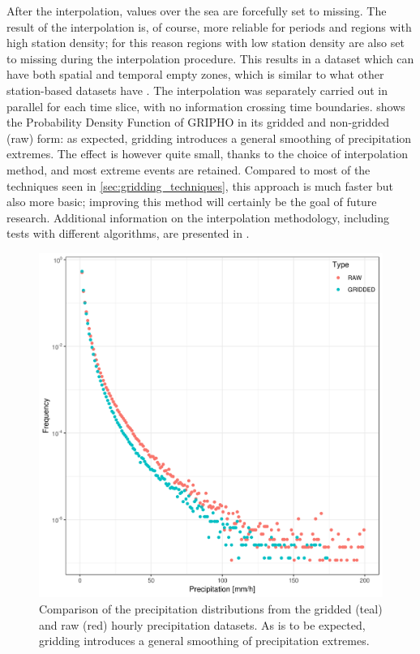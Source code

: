 After the interpolation, values over the sea are forcefully set to missing.
The result of the interpolation is, of course, more reliable for periods and regions with high station density; for this reason regions with low station density are also set to missing during the interpolation procedure.
This results in a dataset which can have both spatial and temporal empty zones, which is similar to what other station-based datasets have \citep[the E-OBS dataset from][for example, also has varying missing values]{Hofstra2008}.
The interpolation was separately carried out in parallel for each time slice, with no information crossing time boundaries.
 shows the Probability Density Function of GRIPHO in its gridded and non-gridded (raw) form: as expected, gridding introduces a general smoothing of precipitation extremes. The effect is however quite small, thanks to the choice of interpolation method, and most extreme events are retained.
Compared to most of the techniques seen in \cref{sec:gridding_techniques}, this approach is much faster but also more basic; improving this method will certainly be the goal of future research.
Additional information on the interpolation methodology, including tests with different algorithms, are presented in \citep[][in preparation]{Fantini2018a}.

\begin{figure}
    \centering
    \includegraphics[width=\textwidth]{figures/rain_dst/validation/compare.png}
    \decoRule
    \caption[PDFs for gridded and raw station data for the Italian hourly precipitation dataset GRIPHO]{Comparison of the precipitation distributions from the gridded (teal) and raw (red) hourly precipitation datasets. As is to be expected, gridding introduces a general smoothing of precipitation extremes.} \label{fig:gridVSnogrid_pdf}
\end{figure}

